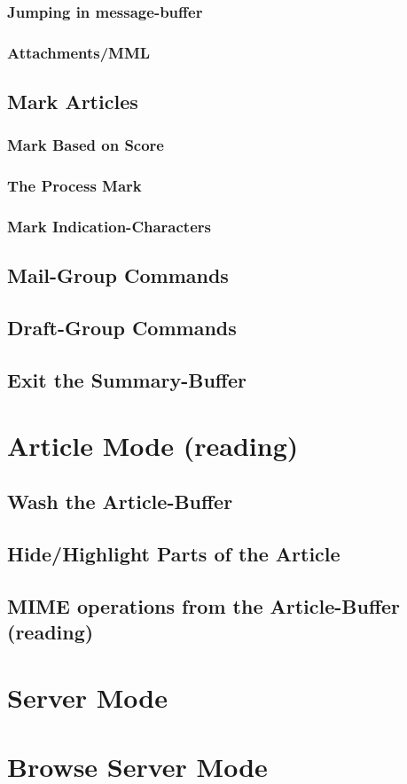 \documentclass{article}
\begin{document}
		\subsubsection*{Jumping in message-buffer}
		\MsgCompositionMovementArticle
		\subsubsection*{Attachments/MML}
		\MsgCompositionMML
	\subsection*{Mark Articles}
	\MarkArticlesGeneral
		\subsubsection*{Mark Based on Score}
		\MarkByScore
		\subsubsection*{The Process Mark}
		\ProcessMark
		\subsubsection*{Mark Indication-Characters}
		\MarkCharacters
%
	\subsection*{Mail-Group Commands}
	\MailGroups
	\subsection*{Draft-Group Commands}
	\DraftGroup
	\subsection*{Exit the Summary-Buffer}
	\ExitSummary
%
%
\section*{Article Mode (reading)}
\ArticleModeGeneral
	\subsection*{Wash the Article-Buffer}
	\WashArticle
	\subsection*{Hide/Highlight Parts of the Article}
	\HideHighlightArticle
	\subsection*{MIME operations from the Article-Buffer (reading)}
	\MIMEArticleMode
%
%
\section*{Server Mode}
\ServerMode
%
%
\section*{Browse Server Mode}
\BrowseServer

\vspace*{\fill}
\Copyright
\end{document}
